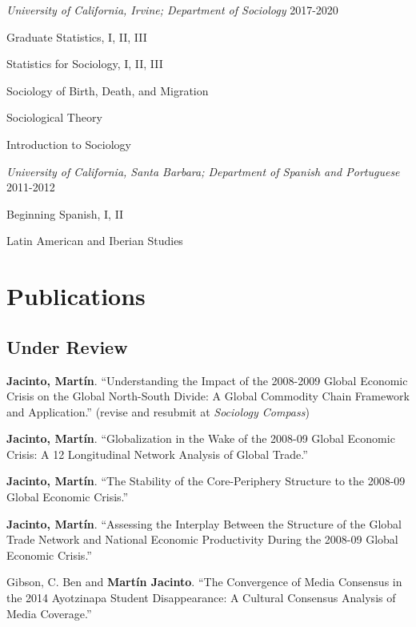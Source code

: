 \documentclass[10pt,]{article}
\providecommand{\tightlist}{%
  \setlength{\itemsep}{0pt}\setlength{\parskip}{0pt}}
\renewenvironment{itemize}{
  \begin{list}{}{
    \setlength{\leftmargin}{1.5em}
  }
}{
  \end{list}
}
\begin{document}
\emph{University of California, Irvine; Department of Sociology}
\hfill 2017-2020

\begin{itemize}
\tightlist
\item
  Graduate Statistics, I, II, III
\item
  Statistics for Sociology, I, II, III
\item
  Sociology of Birth, Death, and Migration
\item
  Sociological Theory
\item
  Introduction to Sociology
\end{itemize}

\emph{University of California, Santa Barbara; Department of Spanish and
Portuguese} \hfill 2011-2012

\begin{itemize}
\tightlist
\item
  Beginning Spanish, I, II
\item
  Latin American and Iberian Studies
\end{itemize}

\hypertarget{publications}{%
\section{Publications}\label{publications}}

\hypertarget{under-review}{%
\subsection{Under Review}\label{under-review}}

\begin{itemize}
\item
  \textbf{Jacinto, Martín}. ``Understanding the Impact of the 2008-2009
  Global Economic Crisis on the Global North-South Divide: A Global
  Commodity Chain Framework and Application.'' (revise and resubmit at
  \emph{Sociology Compass})
\item
  \textbf{Jacinto, Martín}. ``Globalization in the Wake of the 2008-09
  Global Economic Crisis: A 12 Longitudinal Network Analysis of Global
  Trade.''
\item
  \textbf{Jacinto, Martín}. ``The Stability of the Core-Periphery
  Structure to the 2008-09 Global Economic Crisis.''
\item
  \textbf{Jacinto, Martín}. ``Assessing the Interplay Between the
  Structure of the Global Trade Network and National Economic
  Productivity During the 2008-09 Global Economic Crisis.''
\item
  Gibson, C. Ben and \textbf{Martín Jacinto}. ``The Convergence of Media
  Consensus in the 2014 Ayotzinapa Student Disappearance: A Cultural
  Consensus Analysis of Media Coverage.''
\end{itemize}
\end{document}
